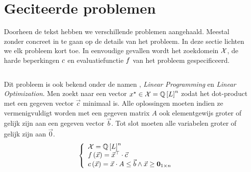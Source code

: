 \section{Geciteerde problemen}

Doorheen de tekst hebben we verschillende problemen aangehaald. Meestal zonder concreet in te gaan op de details van het probleem. In deze sectie lichten we elk probleem kort toe. In eenvoudige gevallen wordt het zoekdomein $\ConfigSet$, de harde beperkingen $\hcfun$ en evaluatiefunctie $\evalfun$ van het probleem gespecificeerd.

\subsection{}

Dit probleem is ook bekend onder de namen , \emph{Linear Programming} en \emph{Linear Optimization}. Men zoekt naar een vector $\xstar\in\ConfigSet=\QbitSet{\bitvar}^n$ zodat het dot-product met een gegeven vector $\vec{c}$ minimaal is. Alle oplossingen moeten indien ze vermenigvuldigt worden met een gegeven matrix $A$ ook elementgewijs groter of gelijk zijn aan een gegeven vector $\vec{b}$. Tot slot moeten alle variabelen groter of gelijk zijn aan $\vec{0}$.
\begin{equation}
\guards{
\ConfigSet=\QbitSet{\bitvar}^n\\
\fun{\evalfun}{\vec{x}}=\transpose{\vec{x}}\cdot\vec{c}\\
\fun{\hcfun}{\vec{x}}=\vec{x}\cdot A\leq\vec{b}\wedge\vec{x}\geq\zeromatrix[1\times n]
}
\end{equation}


\subsection{}

\subsection{}

\subsection{}

\subsection{}

